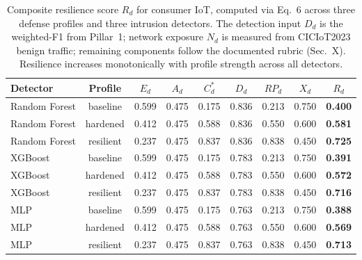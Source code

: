 \begin{table}[t]
\centering
\caption{Composite resilience score $R_d$ for consumer IoT, computed via Eq.~6 across three defense profiles and three intrusion detectors. The detection input $D_d$ is the weighted-F1 from Pillar~1; network exposure $N_d$ is measured from CICIoT2023 benign traffic; remaining components follow the documented rubric (Sec.~X). Resilience increases monotonically with profile strength across all detectors.}
\label{tab:resilience_scores}
\small
\begin{tabular}{lcccccccc}
\toprule
Detector & Profile & $E_d$ & $A_d$ & $C^{*}_{d}$ & $D_d$ & $RP_d$ & $X_d$ & $R_d$ \\
\midrule
Random Forest & baseline & 0.599 & 0.475 & 0.175 & 0.836 & 0.213 & 0.750 & \textbf{0.400} \\
Random Forest & hardened & 0.412 & 0.475 & 0.588 & 0.836 & 0.550 & 0.600 & \textbf{0.581} \\
Random Forest & resilient & 0.237 & 0.475 & 0.837 & 0.836 & 0.838 & 0.450 & \textbf{0.725} \\
\midrule
XGBoost & baseline & 0.599 & 0.475 & 0.175 & 0.783 & 0.213 & 0.750 & \textbf{0.391} \\
XGBoost & hardened & 0.412 & 0.475 & 0.588 & 0.783 & 0.550 & 0.600 & \textbf{0.572} \\
XGBoost & resilient & 0.237 & 0.475 & 0.837 & 0.783 & 0.838 & 0.450 & \textbf{0.716} \\
\midrule
MLP & baseline & 0.599 & 0.475 & 0.175 & 0.763 & 0.213 & 0.750 & \textbf{0.388} \\
MLP & hardened & 0.412 & 0.475 & 0.588 & 0.763 & 0.550 & 0.600 & \textbf{0.569} \\
MLP & resilient & 0.237 & 0.475 & 0.837 & 0.763 & 0.838 & 0.450 & \textbf{0.713} \\
\bottomrule
\end{tabular}
\end{table}
